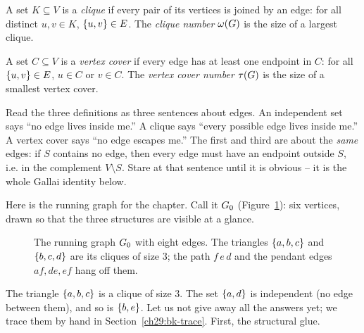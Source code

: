 \begin{definition}[Clique]
\label{ch29:def-clique}
A set $K\subseteq V$ is a \emph{clique} if every pair of its vertices is joined
by an edge: for all distinct $u,v\in K$, $\{u,v\}\in E$. The \emph{clique
number} $\omega(G)$ is the size of a largest clique.
\end{definition}

\begin{definition}
\label{ch29:def-vc}
A set $C\subseteq V$ is a \emph{vertex cover} if every edge has at least one
endpoint in $C$: for all $\{u,v\}\in E$, $u\in C$ or $v\in C$. The \emph{vertex
cover number} $\tau(G)$ is the size of a smallest vertex cover.
\end{definition}

\begin{intuitionbox}
Read the three definitions as three sentences about edges. An independent set
says ``no edge lives inside me.'' A clique says ``every possible edge lives
inside me.'' A vertex cover says ``no edge escapes me.'' The first and third are
about the \emph{same} edges: if $S$ contains no edge, then every edge must have
an endpoint outside $S$, i.e. in the complement $V\setminus S$. Stare at that
sentence until it is obvious -- it is the whole Gallai identity below.
\end{intuitionbox}

Here is the running graph for the chapter. Call it $G_0$
(Figure~\ref{ch29:fig-g0}): six vertices, drawn so that the three structures are
visible at a glance.

\begin{figure}[H]
\centering
{}
\caption{The running graph $G_0$ with eight edges. The triangles $\{a,b,c\}$
and $\{b,c,d\}$ are its cliques of size $3$; the path $f\,e\,d$ and the pendant
edges $af,de,ef$ hang off them.}
\label{ch29:fig-g0}
\end{figure}

The triangle $\{a,b,c\}$ is a clique of size $3$. The set $\{a,d\}$ is
independent (no edge between them), and so is $\{b,e\}$. Let us not give away
all the answers yet; we trace them by hand in Section~\ref{ch29:bk-trace}. First,
the structural glue.

